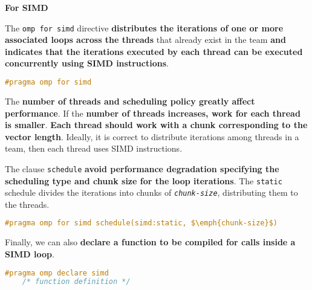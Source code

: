 \highspace
\begin{flushleft}
    \textcolor{Green3}{ \textbf{For SIMD}}
\end{flushleft}
The \texttt{omp for simd} directive \textbf{distributes the iterations of one or more associated loops across the threads} that already exist in the team \textbf{and indicates that the iterations executed by each thread can be executed concurrently using SIMD instructions}.

\begin{openmpbox}
    \begin{lstlisting}[language=C++]
#pragma omp for simd\end{lstlisting}
\end{openmpbox}

\noindent
The \textbf{number of threads and scheduling policy greatly affect performance}. If the \textbf{number of threads increases, work for each thread is smaller}. \textbf{Each thread should work with a chunk corresponding to the vector length}. Ideally, it is correct to distribute iterations among threads in a team, then each thread uses SIMD instructions.

\newpage

\noindent
The clause \texttt{schedule} \textbf{avoid performance degradation specifying the scheduling type and chunk size for the loop iterations}. The \texttt{static} schedule divides the iterations into chunks of \texttt{\emph{chunk-size}}, distributing them to the threads.
\begin{openmpbox}
    \begin{lstlisting}[language=C++, mathescape=true]
#pragma omp for simd schedule(simd:static, $\emph{chunk-size}$)\end{lstlisting}
\end{openmpbox}

\highspace
Finally, we can also \textbf{declare a function to be compiled for calls inside a SIMD loop}.
\begin{openmpbox}
    \begin{lstlisting}[language=C++]
#pragma omp declare simd
    /* function definition */\end{lstlisting}
\end{openmpbox}